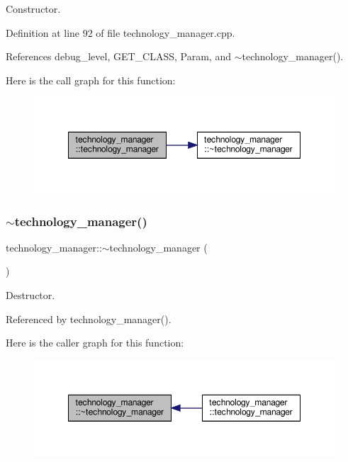 Constructor. 



Definition at line 92 of file technology\+\_\+manager.\+cpp.



References debug\+\_\+level, G\+E\+T\+\_\+\+C\+L\+A\+SS, Param, and $\sim$technology\+\_\+manager().

Here is the call graph for this function\+:
\nopagebreak
\begin{figure}[H]
\begin{center}
\leavevmode
\includegraphics[width=348pt]{df/dc7/classtechnology__manager_aca933b39a83c4a9638a79ad19f8b9ff5_cgraph}
\end{center}
\end{figure}
\mbox{\label{classtechnology__manager_a6b6006913417ce77e17560eae5dc7813}} 
\subsubsection{\texorpdfstring{$\sim$technology\+\_\+manager()}{~technology\_manager()}}
{\footnotesize\ttfamily technology\+\_\+manager\+::$\sim$technology\+\_\+manager (\begin{DoxyParamCaption}{ }\end{DoxyParamCaption})\hspace{0.3cm}{\ttfamily [default]}}



Destructor. 



Referenced by technology\+\_\+manager().

Here is the caller graph for this function\+:
\nopagebreak
\begin{figure}[H]
\begin{center}
\leavevmode
\includegraphics[width=348pt]{df/dc7/classtechnology__manager_a6b6006913417ce77e17560eae5dc7813_icgraph}
\end{center}
\end{figure}


